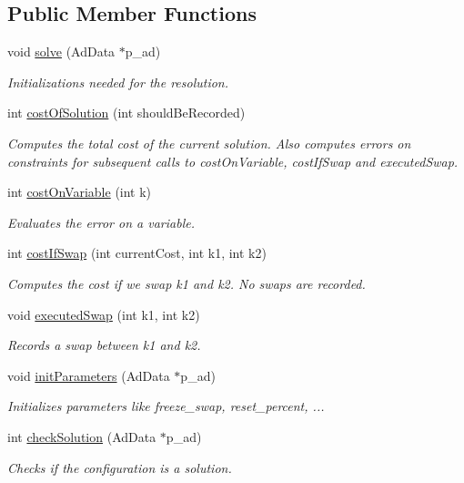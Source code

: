 \subsection*{\-Public \-Member \-Functions}
\begin{DoxyCompactItemize}
\item 
void \hyperlink{classMagicSquare_a78393622fa3f92fe35d1dd0e97e3c0df}{solve} (\-Ad\-Data $\ast$p\-\_\-ad)
\begin{DoxyCompactList}\small\item\em \-Initializations needed for the resolution. \end{DoxyCompactList}\item 
int \hyperlink{classMagicSquare_a8c4a080666b26014b9ed1d8fc8a97470}{cost\-Of\-Solution} (int should\-Be\-Recorded)
\begin{DoxyCompactList}\small\item\em \-Computes the total cost of the current solution. \-Also computes errors on constraints for subsequent calls to cost\-On\-Variable, cost\-If\-Swap and executed\-Swap. \end{DoxyCompactList}\item 
int \hyperlink{classMagicSquare_ae57a2b1183f82870cdd63fddeeb078fe}{cost\-On\-Variable} (int k)
\begin{DoxyCompactList}\small\item\em \-Evaluates the error on a variable. \end{DoxyCompactList}\item 
int \hyperlink{classMagicSquare_a3904934cb8ef871455a57dd0dd9be7ea}{cost\-If\-Swap} (int current\-Cost, int k1, int k2)
\begin{DoxyCompactList}\small\item\em \-Computes the cost if we swap k1 and k2. \-No swaps are recorded. \end{DoxyCompactList}\item 
void \hyperlink{classMagicSquare_a63c7d1ad48a11ff2e2b1889ae883cc0d}{executed\-Swap} (int k1, int k2)
\begin{DoxyCompactList}\small\item\em \-Records a swap between k1 and k2. \end{DoxyCompactList}\item 
void \hyperlink{classMagicSquare_a822df6377b8511394629d796ab8bb690}{init\-Parameters} (\-Ad\-Data $\ast$p\-\_\-ad)
\begin{DoxyCompactList}\small\item\em \-Initializes parameters like freeze\-\_\-swap, reset\-\_\-percent, ... \end{DoxyCompactList}\item 
int \hyperlink{classMagicSquare_a8370790cee1a866ef1e1cead34f2fb69}{check\-Solution} (\-Ad\-Data $\ast$p\-\_\-ad)
\begin{DoxyCompactList}\small\item\em \-Checks if the configuration is a solution. \end{DoxyCompactList}\end{DoxyCompactItemize}
